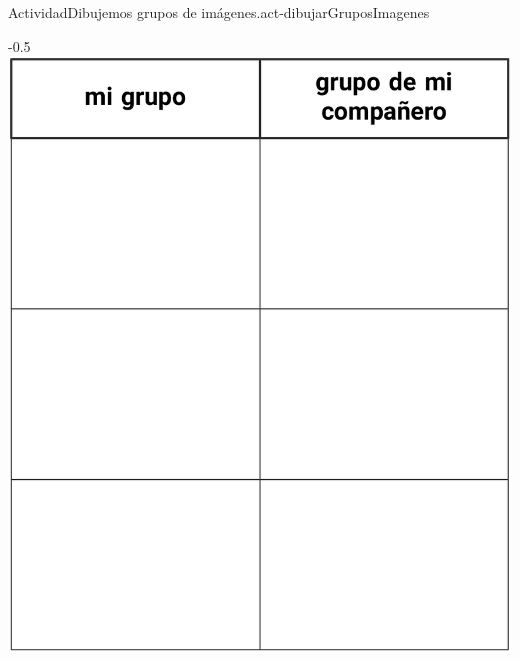\documentclass[20pt]{extarticle}
\begin{document}
\begin{activity}{Actividad}{Dibujemos grupos de imágenes.}{act-dibujarGruposImagenes}%
\begin{image}{0}{1}{0}{-0.5\baselineskip}%
\includegraphics[max width=\linewidth, center]{external/tikz-source/act-dibujarGruposImagenes-tab.pdf}
\end{image}%
\end{activity}
\end{document}
